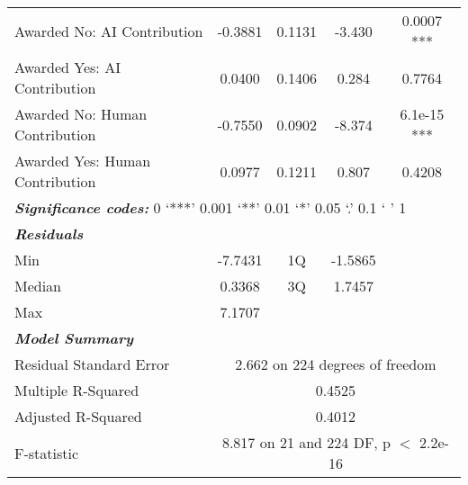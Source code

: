\begin{table}[ht]
\begin{tabular}{lcccc}
        Awarded No: AI Contribution & -0.3881  & 0.1131  & -3.430  & 0.0007 ***  \\
        Awarded Yes: AI Contribution & 0.0400  & 0.1406  & 0.284  & 0.7764  \\
        Awarded No: Human Contribution & -0.7550  & 0.0902  & -8.374  & 6.1e-15 ***  \\
        Awarded Yes: Human Contribution & 0.0977  & 0.1211  & 0.807  & 0.4208  \\
        \midrule
        \multicolumn{5}{l}{\textbf{\textit{Significance codes:}} 0 ‘***’ 0.001 ‘**’ 0.01 ‘*’ 0.05 ‘.’ 0.1 ‘ ’ 1} \\
        \midrule
        \textbf{\textit{Residuals}} & \multicolumn{4}{c}{} \\
        Min & -7.7431 & 1Q & -1.5865 &  \\
        Median & 0.3368 & 3Q & 1.7457 &  \\
        Max & 7.1707 &  &  &  \\
        \midrule
        \textbf{\textit{Model Summary}}\\
        Residual Standard Error & \multicolumn{4}{c}{2.662 on 224 degrees of freedom} \\
        Multiple R-Squared & \multicolumn{4}{c}{0.4525} \\
        Adjusted R-Squared & \multicolumn{4}{c}{0.4012} \\
        F-statistic & \multicolumn{4}{c}{8.817 on 21 and 224 DF, p $<$ 2.2e-16} \\
        \bottomrule
    \end{tabular}
    \label{tab:regression_competence_female}
\end{table}


